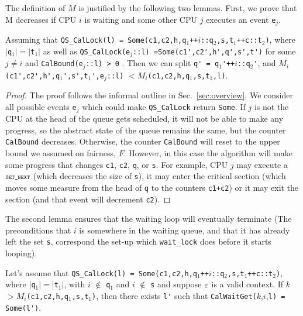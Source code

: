 The definition of $M$ is justified by the following two
lemmas. First, we prove that M decreases if CPU $i$ is waiting and some other CPU
$j$ executes an event \lstinline$e$$_j$.

\begin{lemma}
\label{lem:MCS_CalLock_progress_onestep}
Assuming that \lstinline$QS_CalLock(l) = Some(c1,c2,h,q$$_1$\lstinline$++$$i$\lstinline$::q$$_2$\lstinline$,s,t$$_1$\lstinline$++c::t$$_2$\lstinline$)$, where
$|$\lstinline$q$$_1|=|$\lstinline$t$$_1|$ as well as \lstinline$QS_CalLock(e$$_j$\lstinline$::l) =Some(c1',c2',h',q',s',t')$
for some $j\neq i$ and \lstinline$CalBound(e$$_j$\lstinline$::l) > 0$ .
Then we can split \lstinline$q' = q$$_{1}$\lstinline$'$\lstinline$++$$i$\lstinline$::q$$_{2}$\lstinline$'$, and
$M_i$\lstinline$(c1',c2',h',q$$_{1}$\lstinline$'$\lstinline$,s',t$$_{1}$\lstinline$'$\lstinline$,e$$_j$\lstinline$::l)$ $< M_i$\lstinline$(c1,c2,h,q$$_1$\lstinline$,s,t$$_1$\lstinline$,l)$.
\end{lemma}

\begin{proof}
The proof follows the informal outline in
Sec.~\ref{sec:overview}.  We consider all possible events
\lstinline$e$$_j$ which could make \lstinline$QS_CalLock$ return \lstinline$Some$. If $j$ is not the 
CPU at the head of the queue gets scheduled, it will not be
able to make any progress, so the abstract state of the queue remains the same,
but the counter \lstinline$CalBound$ decreases.
Otherwise, the counter \lstinline$CalBound$ will reset to the upper bound we assumed on fairness, $F$. 
However, in this case the algorithm will make some progress that changes \lstinline$c1$, \lstinline$c2$, \lstinline$q$, or \lstinline$s$.
For example, CPU $j$ may execute a $\SETNEXT$ (which decreases the size of
\lstinline$s$), it may enter the critical section (which moves some measure from
the head of \lstinline$q$ to the counters \lstinline$c1+c2$) or it may exit the section
(and that event will decrement \lstinline$c2$).
\end{proof}


The second lemma ensures that the waiting loop will eventually
terminate (The preconditions that $i$ is somewhere in the waiting queue,
and that it has already left the set \lstinline$s$, correspond the set-up
which \lstinline$wait_lock$ does before it starts looping).

\begin{lemma}
\label{lem:CalWaitGet_exist'}
Let's assume that \lstinline$QS_CalLock(l) = Some(c1,c2,h,q$$_1$\lstinline$++$$i$\lstinline$::q$$_2$\lstinline$,s,t$$_1$\lstinline$++c::t$$_2$\lstinline$)$, where
$|$\lstinline$q$$_1| = |$\lstinline$t$$_1|$, with $i$ $\not\in$ \lstinline$q$$_1$ and $i$ $\not\in$ \lstinline$s$ and suppose $\oracle$ is a valid
context. If $k$ $> M_i$\lstinline$(c1,c2,h,q$$_1$\lstinline$,s,t$$_1$\lstinline$)$, then there exists \lstinline$l'$ such
that \lstinline$CalWaitGet($$k$,$i$,\lstinline$l) = Some(l')$.
\end{lemma}


